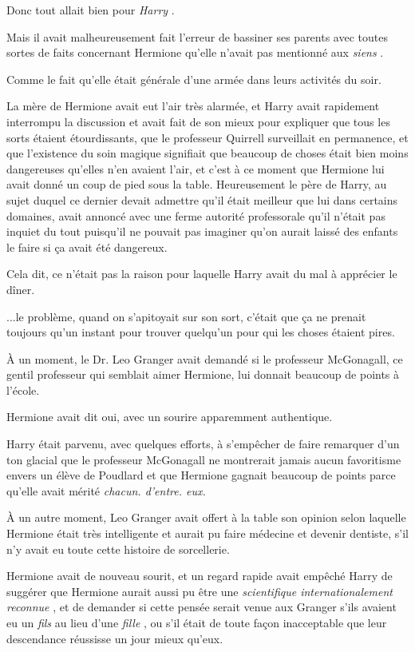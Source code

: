 Donc tout allait bien pour \emph{Harry} .

Mais il avait malheureusement fait l'erreur de bassiner ses parents avec toutes sortes de faits concernant Hermione qu'elle n'avait pas mentionné aux \emph{siens} .

Comme le fait qu'elle était générale d'une armée dans leurs activités du soir.

La mère de Hermione avait eut l'air très alarmée, et Harry avait rapidement interrompu la discussion et avait fait de son mieux pour expliquer que tous les sorts étaient étourdissants, que le professeur Quirrell surveillait en permanence, et que l'existence du soin magique signifiait que beaucoup de choses était bien moins dangereuses qu'elles n'en avaient l'air, et c'est à ce moment que Hermione lui avait donné un coup de pied sous la table. Heureusement le père de Harry, au sujet duquel ce dernier devait admettre qu'il était meilleur que lui dans certains domaines, avait annoncé avec une ferme autorité professorale qu'il n'était pas inquiet du tout puisqu'il ne pouvait pas imaginer qu'on aurait laissé des enfants le faire si ça avait été dangereux.

Cela dit, ce n'était pas la raison pour laquelle Harry avait du mal à apprécier le dîner.

...le problème, quand on s'apitoyait sur son sort, c'était que ça ne prenait toujours qu'un instant pour trouver quelqu'un pour qui les choses étaient pires.

À un moment, le Dr. Leo Granger avait demandé si le professeur McGonagall, ce gentil professeur qui semblait aimer Hermione, lui donnait beaucoup de points à l'école.

Hermione avait dit oui, avec un sourire apparemment authentique.

Harry était parvenu, avec quelques efforts, à s'empêcher de faire remarquer d'un ton glacial que le professeur McGonagall ne montrerait jamais aucun favoritisme envers un élève de Poudlard et que Hermione gagnait beaucoup de points parce qu'elle avait mérité \emph{chacun. d'entre. eux.} 

À un autre moment, Leo Granger avait offert à la table son opinion selon laquelle Hermione était très intelligente et aurait pu faire médecine et devenir dentiste, s'il n'y avait eu toute cette histoire de sorcellerie.

Hermione avait de nouveau sourit, et un regard rapide avait empêché Harry de suggérer que Hermione aurait aussi pu être une \emph{scientifique internationalement reconnue} , et de demander si cette pensée serait venue aux Granger s'ils avaient eu un \emph{fils}  au lieu d'une \emph{fille} , ou s'il était de toute façon inacceptable que leur descendance réussisse un jour mieux qu'eux.


